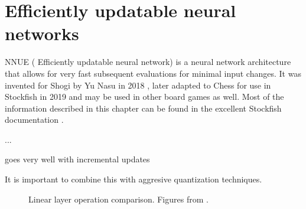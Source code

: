 \section{Efficiently updatable neural networks}

NNUE ( Efficiently updatable neural network) is a neural network architecture that allows for very fast subsequent evaluations for minimal input changes. It was invented for Shogi by Yu Nasu in 2018 \cite{nnue:2018}, later adapted to Chess for use in Stockfish in 2019 and may be used in other board games as well. Most of the information described in this chapter can be found in the excellent Stockfish documentation \cite{nnue-pytorch}.


...

goes very well with incremental updates

It is important to combine this with aggresive quantization techniques.


\begin{figure}[h]
\centering
{}%
\qquad
{}%
\caption{Linear layer operation comparison. Figures from \cite{nnue-pytorch}.}
\label{fig:linear_comparison}
\end{figure}



